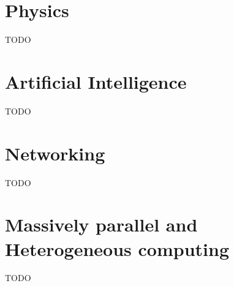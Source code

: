 \documentclass[a4paper]{article}
\begin{document}
\tableofcontents

\section{Physics}

TODO

\section{Artificial Intelligence}

TODO

\section{Networking}

TODO

\section{Massively parallel and Heterogeneous computing}

TODO
\end{document}
